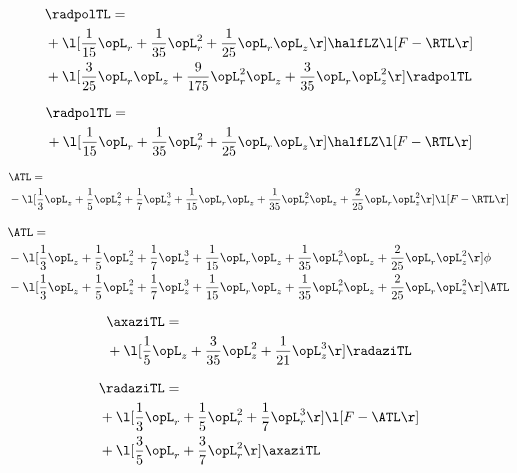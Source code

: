 \begin{alignat}{2} 
\label{eq:linradpolTL_2} 
& \radpolTL = \\ 
& + \l[ \frac{1}{15} \opL_r + \frac{1}{35} \opL_r^{2} + \frac{1}{25} \opL_r \opL_z  \r] \halfLZ \l[ F - \RTL \r] \nonumber \\ 
& + \l[ \frac{3}{25} \opL_r \opL_z + \frac{9}{175} \opL_r^{2} \opL_z + \frac{3}{35} \opL_r \opL_z^{2}  \r] \radpolTL \nonumber \\ 
\end{alignat} 


\begin{alignat}{2} 
\label{eq:linradpolTL_3} 
& \radpolTL = \\ 
& + \l[ \frac{1}{15} \opL_r + \frac{1}{35} \opL_r^{2} + \frac{1}{25} \opL_r \opL_z  \r] \halfLZ \l[ F - \RTL \r] \nonumber \\ 
\end{alignat} 


\begin{alignat}{2} 
\label{eq:isoATL_1} 
& \ATL = \\ 
& - \l[ \frac{1}{3} \opL_z + \frac{1}{5} \opL_z^{2} + \frac{1}{7} \opL_z^{3} + \frac{1}{15} \opL_r \opL_z + \frac{1}{35} \opL_r^{2} \opL_z + \frac{2}{25} \opL_r \opL_z^{2}  \r] \l[ F - \RTL \r] \nonumber \\ 
\end{alignat} 


\begin{alignat}{2} 
\label{eq:isoATL_2} 
& \ATL = \\ 
& - \l[ \frac{1}{3} \opL_z + \frac{1}{5} \opL_z^{2} + \frac{1}{7} \opL_z^{3} + \frac{1}{15} \opL_r \opL_z + \frac{1}{35} \opL_r^{2} \opL_z + \frac{2}{25} \opL_r \opL_z^{2}  \r] \phi \nonumber \\ 
& - \l[ \frac{1}{3} \opL_z + \frac{1}{5} \opL_z^{2} + \frac{1}{7} \opL_z^{3} + \frac{1}{15} \opL_r \opL_z + \frac{1}{35} \opL_r^{2} \opL_z + \frac{2}{25} \opL_r \opL_z^{2}  \r] \ATL \nonumber \\ 
\end{alignat} 


\begin{alignat}{2} 
\label{eq:linaxaziTL_0} 
& \axaziTL = \\ 
& + \l[ \frac{1}{5} \opL_z + \frac{3}{35} \opL_z^{2} + \frac{1}{21} \opL_z^{3}  \r] \radaziTL \nonumber \\ 
\end{alignat} 


\begin{alignat}{2} 
\label{eq:linradaziTL_0} 
& \radaziTL = \\ 
& + \l[ \frac{1}{3} \opL_r + \frac{1}{5} \opL_r^{2} + \frac{1}{7} \opL_r^{3}  \r] \l[ F - \ATL \r] \nonumber \\ 
& + \l[ \frac{3}{5} \opL_r + \frac{3}{7} \opL_r^{2}  \r] \axaziTL \nonumber \\ 
\end{alignat} 



